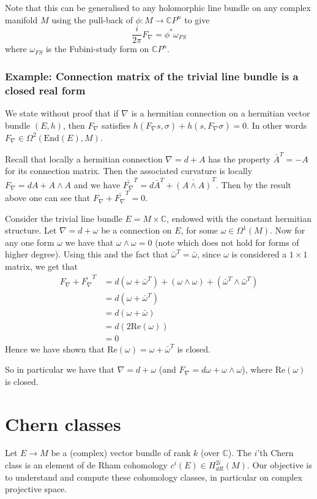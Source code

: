 \documentclass[a4paper]{article}
\theoremstyle{definition} \newtheorem*{definition}{Definition}
\theoremstyle{definition} \newtheorem*{definitions}{Definitions}
\theoremstyle{plain} \newtheorem{theorem}{Theorem}[section]
\theoremstyle{plain} \newtheorem{proposition}[theorem]{Proposition}
\theoremstyle{plain} \newtheorem{corollary}[theorem]{Corollary}
\theoremstyle{plain} \newtheorem{lemma}[theorem]{Lemma}
\theoremstyle{plain} \newtheorem{example}[theorem]{Example}
\newcommand{\complexnos}{\mathbb{C}}
\newcommand{\End}{\text{End}}
\begin{document}
Note that this can be generalised to any holomorphic line bundle on any complex manifold $M$ using the pull-back of $\phi:M\to \complexnos P^n$ to give
$$\frac{i}{2\pi}F_\nabla = \phi^* \omega_{FS}$$
where $\omega_{FS}$ is the Fubini-study form on $\complexnos P^n$.

\subsubsection{Example: Connection matrix of the trivial line bundle is a closed real form}
We state without proof that if $\nabla$ is a hermitian connection on a hermitian vector bundle $(E, h)$, then $F_\nabla$ satisfies $h(F_\nabla s, \sigma)+h(s, F_\nabla \sigma)=0$. In other words $F_\nabla\in \Omega^2(\End(E), M)$.

Recall that locally a hermitian connection $\nabla=d+A$ has the property $\bar{A}^T=-A$ for its connection matrix. Then the associated curvature is locally $F_\nabla = dA+A\wedge A$ and we have $\bar{F_\nabla}^T = d\bar{A}^T + \overline{(A\wedge A)}^T$. Then by the result above one can see that $F_\nabla + \bar{F_\nabla}^T = 0$.

Consider the trivial line bundle $E=M\times \complexnos$, endowed with the constant hermitian structure. Let $\nabla=d+\omega$ be a connection on $E$, for some $\omega \in \Omega^1(M)$. Now for any one form $\omega$ we have that $\omega \wedge \omega =0$ (note which does not hold for forms of higher degree). Using this and the fact that $\bar{\omega}^T = \bar{\omega}$, since $\omega$ is considered a $1\times 1$ matrix, we get that
\begin{align*}
F_\nabla + \bar{F_\nabla}^T & = d(\omega + \bar{\omega}^T) + (\omega\wedge \omega) + (\bar{\omega}^T \wedge \bar{\omega}^T) \\
& = d(\omega + \bar{\omega}^T) \\
& = d(\omega + \bar{\omega}) \\
& = d(2\text{Re}(\omega)) \\
& = 0
\end{align*}
Hence we have shown that $\text{Re}(\omega)=\omega + \bar{\omega}^T$ is closed. 

So in particular we have that $\nabla = d+\omega$ (and $F_\nabla = d\omega + \omega\wedge \omega$), where $\text{Re}(\omega)$ is closed.

\section{Chern classes}
Let $E\to M$ be a (complex) vector bundle of rank $k$ (over $\complexnos$). The $i$'th Chern class is an element of de Rham cohomology
$c^i(E)\in H^{2i}_{dR}(M)$. Our objective is to understand and compute these cohomology classes, in particular on complex projective space.
\end{document}
